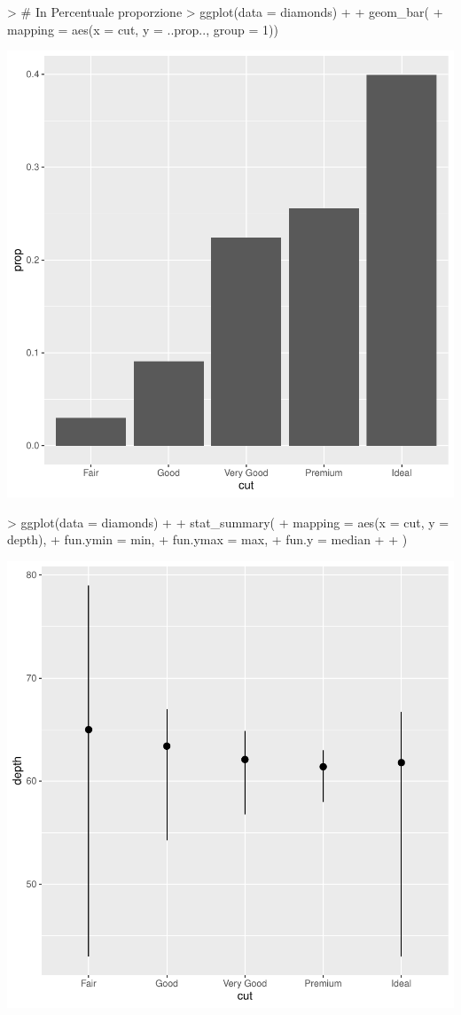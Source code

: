 \documentclass{article}
\begin{document}
\begin{Schunk}
\begin{Sinput}
> # In Percentuale proporzione
> ggplot(data = diamonds) +
+ geom_bar(
+ mapping = aes(x = cut, y = ..prop.., group = 1))
\end{Sinput}
\end{Schunk}
\includegraphics{tidigg-006}
\begin{Schunk}
\begin{Sinput}
> ggplot(data = diamonds) +
+ stat_summary(
+ mapping = aes(x = cut, y = depth),
+ fun.ymin = min,
+ fun.ymax = max,
+ fun.y = median
+ 
+ )
\end{Sinput}
\end{Schunk}
\includegraphics{tidigg-007}
\end{document}
